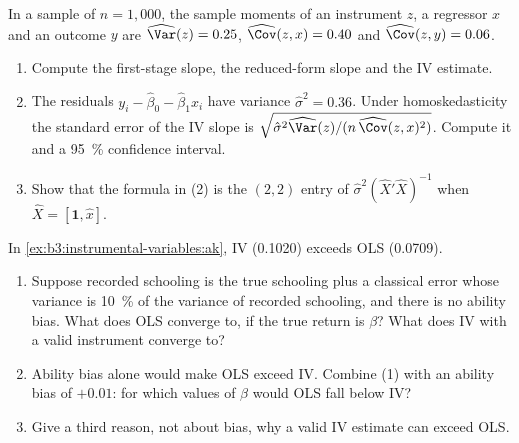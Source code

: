 \begin{exercise}[$\star\star$]\label{exo:b3:instrumental-variables:5}
In a sample of $n = 1{,}000$, the sample moments of an instrument $z$, a
regressor $x$ and an outcome $y$ are $\widehat{\Var}(z) = 0.25$,
$\widehat{\Cov}(z, x) = 0.40$ and $\widehat{\Cov}(z, y) = 0.06$.
\begin{enumerate}
\item Compute the first-stage slope, the reduced-form slope and the IV
estimate.
\item The residuals $y_i - \hat\beta_0 - \hat\beta_1 x_i$ have variance
$\hat\sigma^2 = 0.36$. Under homoskedasticity the standard error of the IV
slope is $\sqrt{\hat\sigma^2 \widehat{\Var}(z) / (n\, \widehat{\Cov}(z,
x)^2)}$. Compute it and a 95~\% confidence interval.
\item Show that the formula in (2) is the $(2,2)$ entry of $\hat\sigma^2(\hat
X'\hat X)^{-1}$ when $\hat X = [\mathbf 1, \hat x]$.
\end{enumerate}
\end{exercise}

\begin{exercise}[$\star\star$]\label{exo:b3:instrumental-variables:6}
In \cref{ex:b3:instrumental-variables:ak}, IV (0.1020) exceeds OLS (0.0709).
\begin{enumerate}
\item Suppose recorded schooling is the true schooling plus a classical error
whose variance is 10~\% of the variance of recorded schooling, and there is no
ability bias. What does OLS converge to, if the true return is $\beta$? What
does IV with a valid instrument converge to?
\item Ability bias alone would make OLS exceed IV. Combine (1) with an
ability bias of $+0.01$: for which values of $\beta$ would OLS fall below IV?
\item Give a third reason, not about bias, why a valid IV estimate can exceed
OLS.
\end{enumerate}
\end{exercise}

